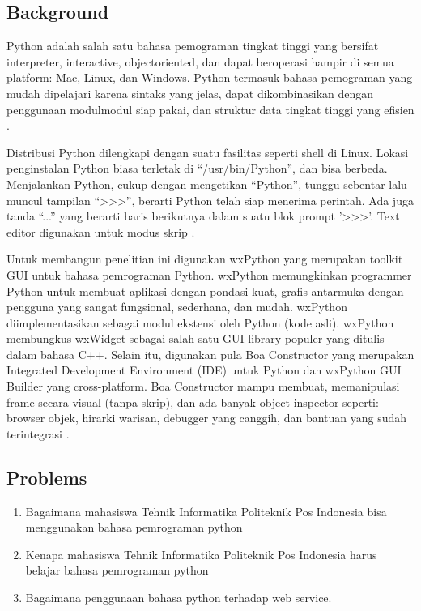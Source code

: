 \subsection{Background}
	\par 
	Python adalah salah satu bahasa pemograman tingkat tinggi yang bersifat interpreter, interactive, objectoriented, dan dapat beroperasi hampir di semua platform: Mac, Linux, dan Windows. Python termasuk bahasa pemograman yang mudah dipelajari karena sintaks yang jelas, dapat dikombinasikan dengan penggunaan modulmodul siap pakai, dan struktur data tingkat tinggi yang efisien \cite{prasetya2012deteksi}. 
	\par
	Distribusi Python dilengkapi dengan suatu fasilitas seperti shell di Linux. Lokasi penginstalan Python biasa terletak di “/usr/bin/Python”, dan bisa berbeda. Menjalankan Python, cukup dengan mengetikan “Python”, tunggu sebentar lalu muncul tampilan “>>>”, berarti Python telah siap menerima perintah. Ada juga tanda “...” yang berarti baris berikutnya dalam suatu blok prompt '>>>'. Text editor digunakan untuk modus skrip \cite{obrst2003semantic}.
	\par
	Untuk membangun penelitian ini digunakan wxPython yang merupakan toolkit GUI untuk bahasa pemrograman Python. wxPython memungkinkan programmer Python untuk membuat aplikasi dengan pondasi kuat, grafis antarmuka dengan pengguna yang sangat fungsional, sederhana, dan mudah. wxPython diimplementasikan sebagai modul ekstensi oleh Python (kode asli). wxPython membungkus wxWidget sebagai salah satu GUI library populer yang ditulis dalam bahasa C++. Selain itu, digunakan pula Boa Constructor yang merupakan Integrated Development Environment (IDE) untuk Python dan wxPython GUI Builder yang cross-platform. Boa Constructor mampu membuat, memanipulasi frame secara visual (tanpa skrip), dan ada banyak object inspector seperti: browser objek, hirarki warisan, debugger yang canggih, dan bantuan yang sudah terintegrasi \cite{malikhah2016eksplorasi}.
	
\subsection{Problems}
	\begin{enumerate}
		\item Bagaimana mahasiswa Tehnik Informatika Politeknik Pos Indonesia bisa menggunakan bahasa pemrograman python
		\item Kenapa mahasiswa Tehnik Informatika Politeknik Pos Indonesia harus belajar bahasa pemrograman python
		\item Bagaimana penggunaan bahasa python terhadap web service.
	\end{enumerate}
	
